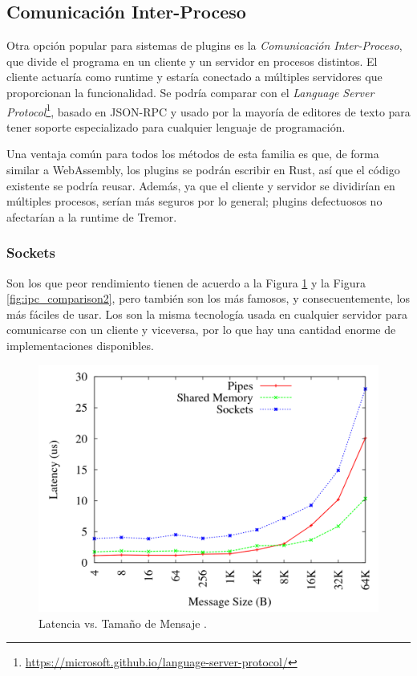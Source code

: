 \subsection{Comunicación Inter-Proceso}

Otra opción popular para sistemas de plugins es la \emph{Comunicación
Inter-Proceso}, que divide el programa en un cliente y un servidor en procesos
distintos. El cliente actuaría como runtime y estaría conectado a múltiples
servidores que proporcionan la funcionalidad. Se podría comparar con el
\emph{Language Server
Protocol}\footnote{\url{https://microsoft.github.io/language-server-protocol/}},
basado en JSON-RPC y usado por la mayoría de editores de texto para tener
soporte especializado para cualquier lenguaje de programación.

Una ventaja común para todos los métodos de esta familia es que, de forma
similar a WebAssembly, los plugins se podrán escribir en Rust, así que el código
existente se podría reusar. Además, ya que el cliente y servidor se dividirían
en múltiples procesos, serían más seguros por lo general; plugins defectuosos no
afectarían a la runtime de Tremor.

\subsubsection{Sockets}

Son los que peor rendimiento tienen de acuerdo a la Figura
\ref{fig:ipc_comparison1} y la Figura \ref{fig:ipc_comparison2}, pero también
son los más famosos, y consecuentemente, los más fáciles de usar. Los \sockets
son la misma tecnología usada en cualquier servidor para comunicarse con un
cliente y viceversa, por lo que hay una cantidad enorme de implementaciones
disponibles.

\begin{figure}
    \centering
    \includegraphics[width=12cm]{./Imagenes/venkataraman2015evaluation1.png}
    \caption{Latencia vs. Tamaño de Mensaje \cite{venkataraman2015evaluation}.}%
    \label{fig:ipc_comparison1}
\end{figure}

